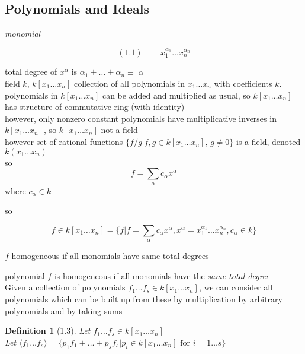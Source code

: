 \documentclass[10pt]{amsart}
\newtheorem{definition}{Definition}
\begin{document}
\begin{multicols*}{2}
\subsection{ Polynomials and Ideals }

\emph{monomial } 

\begin{equation}
  (1.1) \quad \quad \, x_1^{\alpha_1} \dots x_n^{\alpha_n}
\end{equation}

total degree of $x^{\alpha}$ is $\alpha_1 + \dots + \alpha_n \equiv |\alpha|$ \\



field $k$, $k[x_1 \dots x_n]$ collection of all polynomials in $x_1 \dots x_n$ with coefficients $k$.   \\

polynomials in $k[x_1 \dots x_n]$ can be added and multiplied as usual, so $k[x_1 \dots x_n]$ has structure of commutative ring (with identity) \\
however, only nonzero constant polynomials have multiplicative inverses in $k[x_1 \dots x_n]$, so $k[x_1 \dots x_n]$ not a field \\
\quad however set of rational functions $\lbrace f/g | f,g \in k[x_1 \dots x_n], \, g\neq 0\rbrace$ is a field, denoted $k(x_1 \dots x_n)$ \\

so
\[
f = \sum_{\alpha} c_{\alpha}x^{\alpha}
\]
where $c_{\alpha} \in k$

so

\[
f \in k [x_1 \dots x_n ] = \lbrace f | f = \sum_{\alpha} c_{\alpha} x^{\alpha} , x^{\alpha} = x_1^{\alpha_1} \dots x_n^{\alpha_n}, c_{\alpha} \in k \rbrace
\]

$f$ homogeneous if all monomials have same total degrees

polynomial $f$ is homogeneous if all monomials have the \emph{same total degree} \\

Given a collection of polynomials $f_1 \dots f_s \in k[x_1 \dots x_n]$, we can consider all polynomials which can be built up from these by multiplication by arbitrary polynomials and by taking sums

\begin{definition}[1.3] Let $f_1 \dots f_s \in k[x_1 \dots x_n]$ \\
Let $\langle f_1 \dots f_s \rangle = \lbrace p_1 f_1  + \dots + p_s f_s | p_i \in k[x_1 \dots x_n] \text{ for } i = 1 \dots s \rbrace$
\end{definition}



\end{multicols*}
\end{document}
